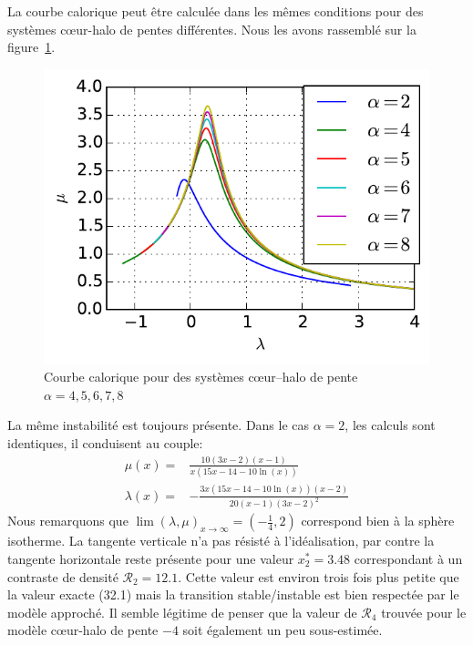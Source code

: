 	La courbe calorique peut être calculée dans les mêmes conditions pour des systèmes cœur-halo de pentes différentes. Nous les avons rassemblé
	sur la figure~\ref{ToyModel::AllAlpha}.
	\begin{figure}
			\centering \includegraphics{theorie/graphe/alpha_all.pdf}
			\caption{Courbe calorique pour des systèmes cœur--halo de pente $\alpha=4, 5, 6, 7, 8$\label{ToyModel::AllAlpha}}
	\end{figure}
	La même instabilité est toujours présente. Dans le cas $\alpha=2$, les calculs sont identiques, il conduisent au couple:
	\begin{eqnarray}
		\mu(x) =& \frac{10 (3x-2) (x-1)}{x(15x-14-10\ln(x))} \\
		\lambda(x) =& -\frac{3x(15x-14-10\ln(x))(x-2)}{20(x-1)(3x-2)^2}
	\end{eqnarray}
	Nous remarquons que $\lim(\lambda,\mu)_{x\to\infty}=(-\frac{1}{4},2)$ correspond bien à la sphère isotherme. La tangente verticale n'a pas
	résisté à l'idéalisation, par contre la tangente horizontale reste présente pour une valeur $x^*_2=3.48$ correspondant à un contraste de
	densité $\mathcal{R}_2= 12.1$. Cette valeur est environ trois fois plus petite que la valeur exacte (32.1) mais la transition stable/instable
	est bien respectée par le modèle approché. Il semble légitime de penser que la valeur de $\mathcal{R}_4$ trouvée pour le modèle cœur-halo de
	pente $-4$ soit également un peu sous-estimée.
